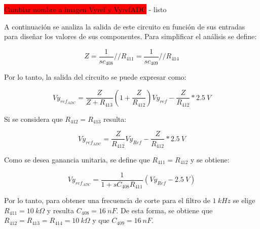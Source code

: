 \colorbox{red}{Cambiar nombre a imagen Vyref y VyrefADC} - listo
%
%  
%  
 
A continuación se analiza la salida de este circuito en función de sus entradas para diseñar los valores de sus componentes. Para simplificar el análisis se define:

\begin{equation*} 
	Z=\frac{1}{sc_{408}}//R_{411}=\frac{1}{sc_{409}}//R_{414}
\end{equation*}

Por lo tanto, la salida del circuito se puede expresar como:

\begin{equation*} 
	Vy_{ref_{ADC}}=\frac{Z}{Z+R_{413}}(1+\frac{Z}{R_{412}})Vy_{ref}-\frac{Z}{R_{412}}*2.5\:V
\end{equation*}

Si se considera que $R_{412}=R_{413}$ resulta:

\begin{equation*} 
	Vy_{ref_{ADC}}=\frac{Z}{R_{412}}Vy_{Ref}-\frac{Z}{R_{412}}*2.5\:V
\end{equation*}


Como se desea ganancia unitaria, se define que $R_{411}=R_{412}$ y se obtiene:

\begin{equation*} 
	Vy_{ref_{ADC}}=\frac{1}{1+sC_{408}R_{411}}(Vy_{Ref}-2.5\:V)
\end{equation*}


Por lo tanto, para obtener una frecuencia de corte para el filtro de $1\:kHz$ se elige $R_{411}=10\:k\Omega$ y resulta $C_{408}=16\:nF$. De esta forma, se obtiene que $R_{412}=R_{413}=R_{414}=10\:k\Omega$ y que $C_{409}=16\:nF$.


